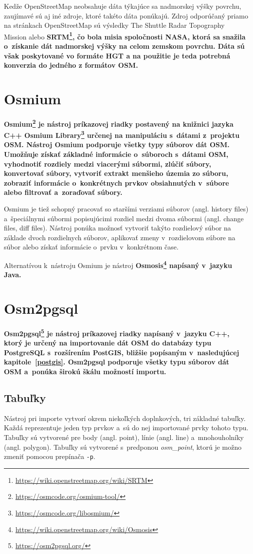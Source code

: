 Kedže OpenStreetMap neobsahuje dáta týkajúce sa nadmorskej výšky povrchu, zaujímavé sú aj iné zdroje, ktoré takéto dáta ponúkajú. Zdroj odporúčaný priamo na stránkach OpenStreetMap sú výsledky The Shuttle Radar Topography Mission alebo \bf SRTM\rm\footnote{\url{https://wiki.openstreetmap.org/wiki/SRTM}}, čo bola misia spoločnosti NASA, ktorá sa snažila o~získanie dát nadmorskej výšky na celom zemskom povrchu. Dáta sú však poskytované vo formáte HGT a na použitie je teda potrebná konverzia do jedného z formátov OSM.

\section{Osmium}
\label{osmium}
\bf Osmium\rm\footnote{\url{https://osmcode.org/osmium-tool/}} je nástroj príkazovej riadky postavený na knižnici jazyka C++ \bf Osmium Library\rm\footnote{\url{https://osmcode.org/libosmium/}} určenej na manipuláciu s~dátami z~projektu OSM. Nástroj Osmium podporuje všetky typy súborov dát OSM. Umožňuje získať základné informácie o~súboroch s~dátami OSM, vyhodnotiť rozdiely medzi viacerými súbormi, zlúčiť súbory, konvertovať súbory, vytvoriť extrakt menšieho územia zo súboru, zobraziť informácie o~konkrétnych prvkov obsiahnutých v~súbore alebo filtrovať a~zoraďovať súbory. 

Osmium je tiež schopný pracovať so staršími verziami súborov (angl. history files) a~špeciálnymi súbormi popisujúcimi rozdiel medzi dvoma súbormi (angl. change files, diff files). Nástroj ponúka možnosť vytvoriť takýto rozdielový súbor na základe dvoch rozdielnych súborov, aplikovať zmeny v~rozdielovom súbore na súbor alebo získať informácie o~prvku v~konkrétnom čase. 

Alternatívou k~nástroju Osmium je nástroj \bf Osmosis\rm\footnote{\url{https://wiki.openstreetmap.org/wiki/Osmosis}} napísaný v~jazyku Java.

\section{Osm2pgsql}
\label{osm2pgsql}
\bf Osm2pgsql\rm\footnote{\url{https://osm2pgsql.org/}} je nástroj príkazovej riadky napísaný v~jazyku C++, ktorý je určený na importovanie dát OSM do databázy typu PostgreSQL s~rozšírením PostGIS, bližšie popísaným v~nasledujúcej kapitole~\ref{postgis}. Osm2pgsql podporuje všetky typu súborov dát OSM a~ponúka širokú škálu možností importu.

\subsection*{Tabuľky}
Nástroj pri importe vytvorí okrem niekoľkých doplnkových, tri základné tabuľky. Každá reprezentuje jeden typ prvkov a~sú do nej importované prvky tohoto typu. Tabuľky sú vytvorené pre body (angl. point), línie (angl. line) a~mnohouholníky (angl. polygon). Tabuľky sú vytvorené s~predponou {\it osm\_point}, ktorú je možno zmeniť pomocou prepínača {\tt -p}.

